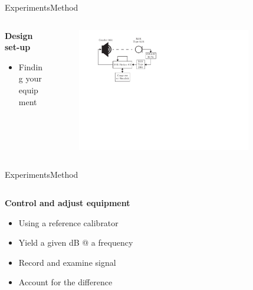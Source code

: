 \begin{frame}{Experiments}{Method}		
	\begin{columns}
		\begin{column}{0.5\textwidth}
			\textbf{Design set-up}
			\begin{itemize}
				\item Finding your equipment
			\end{itemize}	
		\end{column}
		\begin{column}{0.5\textwidth} 
			\begin{figure}[h]
				\includegraphics[width=0.85\textwidth]{figures/SimpleSetupValues}
			\end{figure}
		\end{column}
	\end{columns}
\end{frame}
\begin{frame}{Experiments}{Method}		
	\begin{columns}
		\begin{column}{0.5\textwidth}
			\textbf{Control and adjust equipment}
			\begin{itemize}
				\item Using a reference calibrator
				\item Yield a given dB @ a frequency
				\item Record and examine signal
				\item Account for the difference 
			\end{itemize}	
		\end{column}	
		\begin{column}{0.5\textwidth} 
		\end{column}
	\end{columns}
\end{frame}


